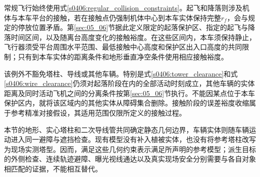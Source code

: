 常规飞行始终使用式\eqref{s0406:regular_collision_constraints}。起飞和降落则涉及机体与本车平台的接触，若在接触点仍强制机体中心到本车实体保持完整$r_f$，会与规定的停放位置矛盾。第\ref{sec:05_06}节据此定义限定的起落保护区、指定的起飞与降落时间区间，以及随离台高度变化的接触裕度。在这些区间内，本车须保持静止，飞行器须受平台周围水平范围、最低接触中心高度和保护区出入口高度的共同限制；只有到本车实体的距离条件和地形垂直净空条件使用相应接触裕度。

该例外不豁免塔柱、导线或其他车辆。特别是式\eqref{s0406:tower_clearance}和式\eqref{s0406:wire_clearance}仍须对起落阶段在内的全部活动时刻成立，其他车辆的实体距离及同时活动飞机之间的分离条件按第\ref{sec:05_06}节执行。不能因某点位于本车保护区内，就将该区域内的其他实体从障碍集合删除。接触阶段的误差裕度收缩属于参考精准对接假设，其适用范围仅限所定义的接触过程。

本节的地形、实心塔柱和二次导线管共同确定静态几何边界，车辆实体则随车辆运动进入同一避障与遮挡检查。现有模型没有补入植被实体，也没有将参考塔柱改写为现场实测塔型。因而，满足这些几何约束表示满足所声明的参考模型；派生目标的外侧检查、连续轨迹避障、曝光视线通达以及真实现场安全分别需要与各自对象相匹配的证据，不能相互替代。
